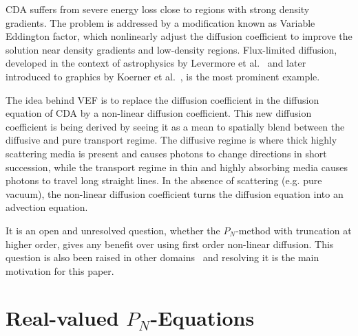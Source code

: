 CDA suffers from severe energy loss close to regions with strong density gradients. The problem is addressed by a modification known as Variable Eddington factor, which nonlinearly adjust the diffusion coefficient to improve the solution near density gradients and low-density regions. Flux-limited diffusion, developed in the context of astrophysics by Levermore et al.~\cite{Levermore81} and later introduced to graphics by Koerner et al.~\cite{Koerner14}, is the most prominent example.

The idea behind VEF is to replace the diffusion coefficient in the diffusion equation of CDA by a non-linear diffusion coefficient. This new diffusion coefficient is being derived by seeing it as a mean to spatially blend between the diffusive and pure transport regime. The diffusive regime is where thick highly scattering media is present and causes photons to change directions in short succession, while the transport regime in thin and highly absorbing media causes photons to travel long straight lines. In the absence of scattering (e.g. pure vacuum), the non-linear diffusion coefficient turns the diffusion equation into an advection equation.

It is an open and unresolved question, whether the $P_N$-method with truncation at higher order, gives any benefit over using first order non-linear diffusion. This question is also been raised in other domains~\cite{Olson00} and resolving it is the main motivation for this paper.
 






\section{Real-valued $P_N$-Equations}
\label{sec:pnequations}

